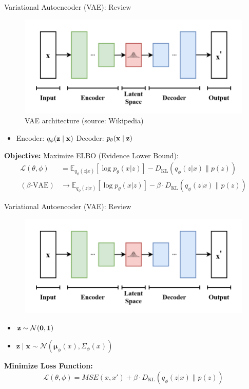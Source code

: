 \documentclass{beamer}
\begin{document}
\begin{frame}{Variational Autoencoder (VAE): Review}
    \begin{figure}
    \centering
    \includegraphics[width=0.6\linewidth]{docs/proposal/img/vaewiki.png}
    \caption{VAE architecture (source: Wikipedia)}
    \label{fig:vaewiki}
\end{figure}
\begin{itemize}
    \item Encoder: $q_\phi(\bf{z}\mid \bf{x})$ \quad Decoder: $p_\theta(\bf{x}\mid \bf{z})$

\end{itemize}
\textbf{Objective:} Maximize ELBO (Evidence Lower Bound):
\begin{align*}
\mathcal{L}(\theta, \phi) &= \mathbb{E}_{q_\phi(z|x)}[\log p_\theta(x|z)] - D_{\text{KL}}(q_\phi(z|x) \parallel p(z))\\
(\beta\text{-VAE})&\rightarrow \mathbb{E}_{q_\phi(z|x)}[\log p_\theta(x|z)] - \beta \cdot D_{\text{KL}}(q_\phi(z|x) \parallel p(z))
\end{align*}
\end{frame}


\begin{frame}{Variational Autoencoder (VAE): Review}

\begin{figure}
    \centering
    \includegraphics[width=0.5\linewidth]{docs/proposal/img/vaewiki.png}
\end{figure}

\begin{itemize}
    \item $\bf{z} \sim \mathcal{N}(0,\bf{1})$
    \item $\mathbf{z}\mid \mathbf{x}\sim \mathcal{N}(\mathbf{\mu}_\phi(x), \Sigma_\phi(x))$
\end{itemize}
\textbf{Minimize Loss Function:}
$$\mathcal{L}(\theta, \phi) = MSE(x, x') + \beta \cdot D_{\text{KL}}(q_\phi(z|x) \parallel p(z))$$
\end{frame}
\end{document}
